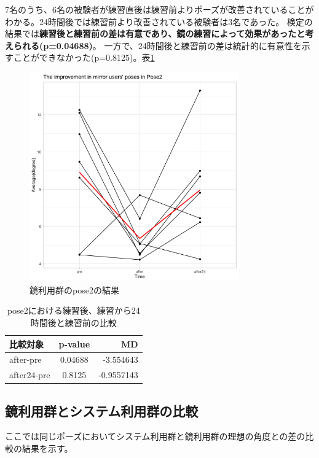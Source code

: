      7名のうち、6名の被験者が練習直後は練習前よりポーズが改善されていることがわかる。24時間後では練習前より改善されている被験者は3名であった。
      検定の結果では{\bf 練習後と練習前の差は有意であり、鏡の練習によって効果があったと考えられる(p=0.04688)}。 一方で、24時間後と練習前の差は統計的に有意性を示すことができなかった(p=0.8125)。表\ref{table:pose2_mirror_p_value}
      \begin{figure}[H]
        \begin{center}
        \includegraphics[width=9cm]{figures/pose2_system_false_graph.png}
        \caption{鏡利用群のpose2の結果}
        \label{fig:pose2_mirror}
        \end{center}
      \end{figure}

      \begin{table}[ht]
        \centering
        \caption{pose2における練習後、練習から24時間後と練習前の比較}
        \begin{tabular}{lcr}
        \hline
        \textbf{比較対象} & \textbf{p-value} & \textbf{MD} \\ \hline
        after-pre & 0.04688 & -3.554643 \\ \hline
        after24-pre & 0.8125 & -0.9557143 \\ \hline
        \end{tabular}
        \label{table:pose2_mirror_p_value}
        \end{table}

  \subsection{鏡利用群とシステム利用群の比較}
    ここでは同じポーズにおいてシステム利用群と鏡利用群の理想の角度との差の比較の結果を示す。

